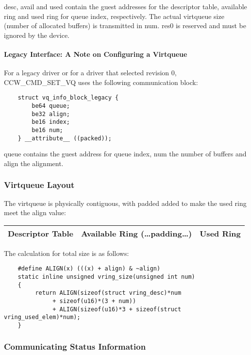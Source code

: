desc, avail and used contain the guest addresses for the descriptor table,
available ring and used ring for queue index, respectively. The actual
virtqueue size (number of allocated buffers) is transmitted in num.
res0 is reserved and must be ignored by the device.

\paragraph{Legacy Interface: A Note on Configuring a Virtqueue}\label{sec:Virtio Transport Options / Virtio over channel I/O / Device Initialization / Configuring a Virtqueue / Legacy Interface: A Note on Configuring a Virtqueue}

For a legacy driver or for a driver that selected revision 0,
CCW_CMD_SET_VQ uses the following communication block:

\begin{lstlisting}
	struct vq_info_block_legacy {
		be64 queue;
		be32 align;
		be16 index;
		be16 num;
	} __attribute__ ((packed));
\end{lstlisting}

queue contains the guest address for queue index, num the number of buffers
and align the alignment.

\subsubsection{Virtqueue Layout}\label{sec:Virtio Transport Options / Virtio over channel I/O / Device Initialization / Virtqueue Layout}

The virtqueue is physically contiguous, with padded added to make the
used ring meet the align value:

\begin{tabular}{|l|l|l|}
\hline
Descriptor Table & Available Ring (\ldots padding\ldots) & Used Ring \\
\hline
\end{tabular}

The calculation for total size is as follows:

\begin{lstlisting}
	#define ALIGN(x) (((x) + align) & ~align)
	static inline unsigned vring_size(unsigned int num)
	{
	     return ALIGN(sizeof(struct vring_desc)*num
			  + sizeof(u16)*(3 + num))
	          + ALIGN(sizeof(u16)*3 + sizeof(struct vring_used_elem)*num);
	}
\end{lstlisting}

\subsubsection{Communicating Status Information}\label{sec:Virtio Transport Options / Virtio over channel I/O / Device Initialization / Communicating Status Information}

